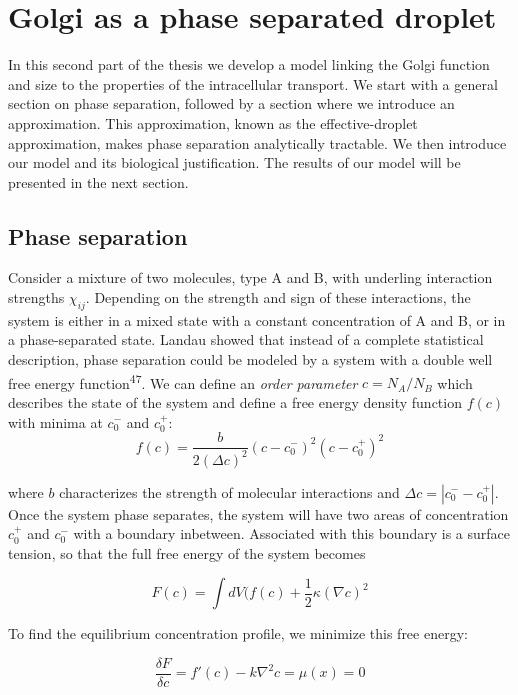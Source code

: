 \documentclass{Dissertate}
\begin{document}
\hypertarget{golgi-as-a-phase-separated-droplet}{%
\chapter{Golgi as a phase separated
droplet}\label{golgi-as-a-phase-separated-droplet}}

In this second part of the thesis we develop a model linking the Golgi
function and size to the properties of the intracellular transport. We
start with a general section on phase separation, followed by a section
where we introduce an approximation. This approximation, known as the
effective-droplet approximation, makes phase separation analytically
tractable. We then introduce our model and its biological justification.
The results of our model will be presented in the next section.

\hypertarget{phase-separation}{%
\section{Phase separation}\label{phase-separation}}

Consider a mixture of two molecules, type A and B, with underling
interaction strengths \(\chi_{ij}\). Depending on the strength and sign
of these interactions, the system is either in a mixed state with a
constant concentration of A and B, or in a phase-separated state. Landau
showed that instead of a complete statistical description, phase
separation could be modeled by a system with a double well free energy
function\textsuperscript{47}. We can define an \emph{order parameter}
\(c=N_A/N_B\) which describes the state of the system and define a free
energy density function \(f(c)\) with minima at \(c_0^-\) and \(c_0^+\):
\[
f(c) = \frac{b}{2(\Delta c)^2}(c-c_0^-)^2(c-c_0^+)^2
\]

where \(b\) characterizes the strength of molecular interactions and
\(\Delta c = |c_0^--c_0^+|\). Once the system phase separates, the
system will have two areas of concentration \(c_0^+\) and \(c_0^-\) with
a boundary inbetween. Associated with this boundary is a surface
tension, so that the full free energy of the system becomes

\[
F(c) = \int dV (f(c)+\frac{1}{2}\kappa (\nabla c)^2
\]

To find the equilibrium concentration profile, we minimize this free
energy:

\begin{equation}
\frac{\delta F}{\delta c} = f'(c)-k\nabla^2c=\mu(x) =0
\label{eq:euler}\end{equation}
\end{document}
